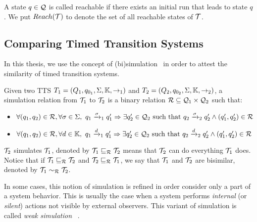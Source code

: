 A state $q\in\mathcal{Q}$ is called reachable if there exists an initial run
that leads to state $q$. We put $Reach(\mathcal{T})$ to denote the set of all 
reachable states of $\mathcal{T}$.
\subsection{Comparing Timed Transition Systems}
In this thesis, we use the concept of (bi)simulation~\cite{} 
in order to attest the similarity of timed transition systems.
\begin{definition}[Simulation]\label{def:sim}
  Given two TTS $T_{1}=(Q_{1},q_{0_{1}},\Sigma, \mathbb{K},\to_{1})$ and $T_{2}=(Q_{2},q_{0_{2}},\Sigma, \mathbb{K},\to_{2})$, a simulation relation from 
  $\mathcal{T}_1$ to $\mathcal{T}_2$ is a binary relation $\mathcal{R}\subseteq\mathcal{Q}_1
  \times\mathcal{Q}_2$ such that:
  \begin{itemize}
    \item $\forall(q_1,q_2)\in\mc{R},\forall\sigma\in\Sigma,\ 
      q_1\transitb{\sigma}{1}q_1'\Rightarrow\exists q'_2\in\mc{Q}_2 
      \text{ such that } q_2\transitb{\sigma}{2}q_2'\wedge
      (q_1',q_2')\in\mc{R}$
    \item $\forall(q_1,q_2)\in\mc{R},\forall d\in\mb{K},\ 
      q_1\transitb{d}{1}q_1'\Rightarrow\exists q'_2\in\mc{Q}_2 
      \text{ such that } q_2\transitb{d}{2}q_2'\wedge
      (q_1',q_2')\in\mc{R}$
  \end{itemize}
\end{definition}
  $\mathcal{T}_2$ simulates $\mathcal{T}_1$, denoted by $\mathcal{T}_1\sqsubseteq_{\mathcal{R}}\mathcal{T}_2$
  means that $\mathcal{T}_2$ can do everything $\mathcal{T}_1$ does. Notice that if
  $\mathcal{T}_1\sqsubseteq_{\mathcal{R}}\mathcal{T}_2$ and $\mathcal{T}_2\sqsubseteq_{\mathcal{R}}\mathcal{T}_1$,
  we say that $\mathcal{T}_1$ and $\mathcal{T}_2$ are bisimilar, denoted by
  $\mathcal{T}_1\sim_{\mathcal{R}}\mathcal{T}_2$.  

In some cases, this notion of simulation is refined in order consider only
a part of a system behavior. This is usually the case when a system
performs \emph{internal} (or \emph{silent}) actions not visible by external
observers. This variant of simulation is called \emph{weak simulation}
~\cite{}.

